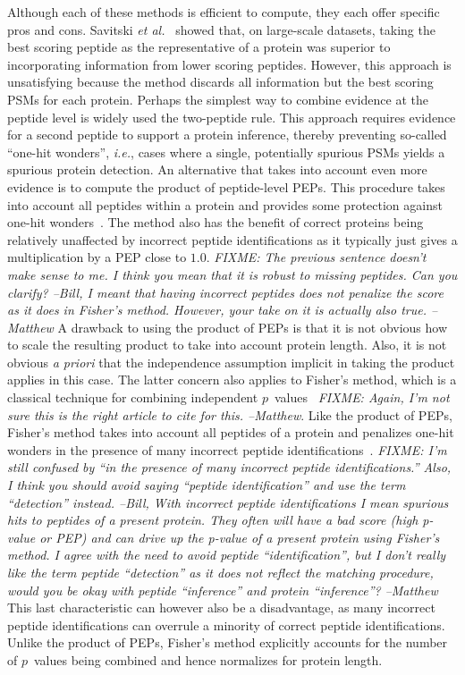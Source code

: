 \documentclass{article}
\begin{document}
Although each of these methods is efficient to compute, they each
offer specific pros and cons.  Savitski {\em et
  al.}~\cite{savitski2015scalable} showed that, on large-scale
datasets, taking the best scoring peptide as the representative of a
protein was superior to incorporating information from lower scoring
peptides. However, this approach is unsatisfying because the method
discards all information but the best scoring PSMs for each protein.
Perhaps the simplest way to combine evidence at the peptide level is
widely used the two-peptide rule.  This approach requires evidence for
a second peptide to support a protein inference, thereby preventing
so-called ``one-hit wonders'', {\em i.e.}, cases where a single,
potentially spurious PSMs yields a spurious protein detection.  An
alternative that takes into account even more evidence is to compute
the product of peptide-level PEPs. This procedure takes into account
all peptides within a protein and provides some protection against
one-hit wonders~\cite{cox2008maxquant}. The method also has the
benefit of correct proteins being relatively unaffected by incorrect
peptide identifications as it typically just gives a multiplication by
a PEP close to $1.0$. {\em FIXME: The previous sentence doesn't make
sense to me.  I think you mean that it is robust to missing peptides. 
Can you clarify? --Bill, I meant that having incorrect peptides does
not penalize the score as it does in Fisher's method. However, your
take on it is actually also true. --Matthew} A drawback to
using the product of PEPs is that it is not obvious how to scale the
resulting product to take into account protein length.  Also, it is
not obvious {\em a priori} that the independence assumption implicit
in taking the product applies in this case.  The latter concern also
applies to Fisher's method, which is a classical technique for
combining independent $p$~values~\cite{fisher1925statistical} {\em
FIXME: Again, I'm not sure this is the right
article to cite for this. --Matthew}. Like
the product of
PEPs, Fisher's method takes into account all peptides of a protein and
penalizes one-hit wonders in the presence of many incorrect peptide
identifications~\cite{spirin2011assigning, alves2015mass,
  granholm2013determining}. {\em FIXME: I'm still confused by ``in the
  presence of many incorrect peptide identifications.''  Also, I think
  you should avoid saying ``peptide identification'' and use the term
  ``detection'' instead. --Bill, With incorrect peptide
identifications I mean spurious hits to peptides of a present
protein. They often will have a bad score (high p-value or PEP) and
can drive up the p-value of a present protein using Fisher's method.
I agree with the need to avoid peptide ``identification'', but I don't
really like the term peptide ``detection'' as it does not reflect the
matching procedure, would you be okay with peptide
``inference'' and protein ``inference''? --Matthew} This last
characteristic can however
also be a disadvantage, as many incorrect peptide identifications can
overrule a minority of correct peptide identifications.  Unlike the
product of PEPs, Fisher's method explicitly accounts for the number of
$p$~values being combined and hence normalizes for protein length.
\end{document}
